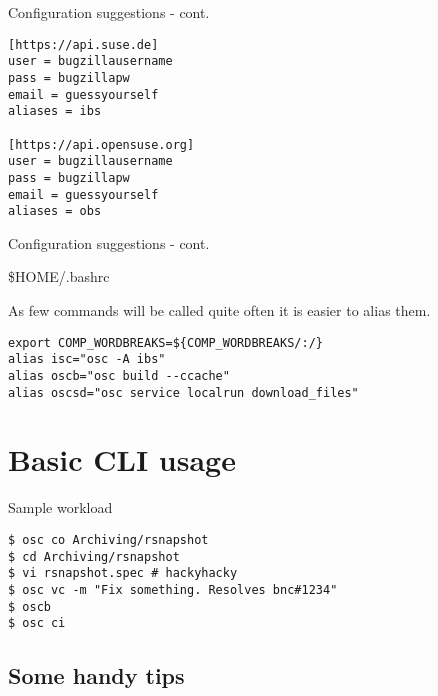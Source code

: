 \documentclass{beamer}
\begin{document}
\begin{frame}[fragile]{Configuration suggestions - cont.}
	\begin{small}
	\begin{verbatim}
[https://api.suse.de]
user = bugzillausername
pass = bugzillapw
email = guessyourself
aliases = ibs

[https://api.opensuse.org]
user = bugzillausername
pass = bugzillapw
email = guessyourself
aliases = obs
	\end{verbatim}
	\end{small}
\end{frame}

\begin{frame}[fragile]{Configuration suggestions - cont.}
	\begin{center}\$HOME/.bashrc\end{center}
	As few commands will be called quite often it is easier to alias them.
	\begin{tiny}
	\begin{verbatim}
export COMP_WORDBREAKS=${COMP_WORDBREAKS/:/}
alias isc="osc -A ibs"
alias oscb="osc build --ccache"
alias oscsd="osc service localrun download_files"
	\end{verbatim}
	\end{tiny}
\end{frame}

\section{Basic CLI usage}

\begin{frame}[fragile]{Sample workload}
	\begin{small}
	\begin{verbatim}
$ osc co Archiving/rsnapshot
$ cd Archiving/rsnapshot
$ vi rsnapshot.spec # hackyhacky
$ osc vc -m "Fix something. Resolves bnc#1234"
$ oscb
$ osc ci
	\end{verbatim}
	\end{small}
\end{frame}

\subsection{Some handy tips}
\end{document}
